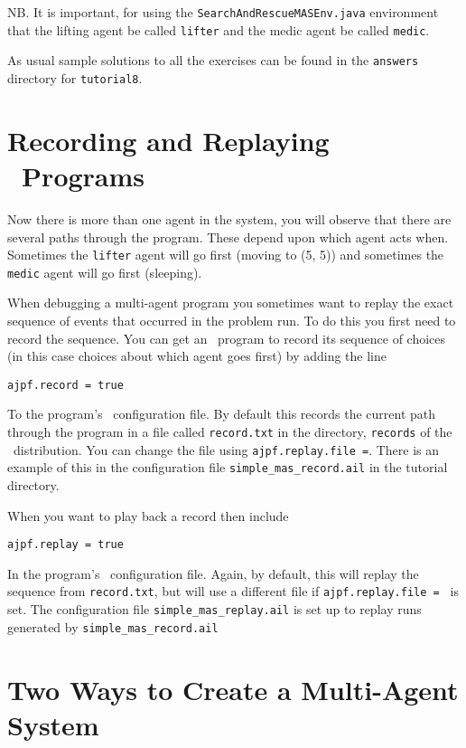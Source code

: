 NB. It is important, for using the \texttt{SearchAndRescueMASEnv.java} environment that the lifting agent be called \texttt{lifter} and the medic agent be called \texttt{medic}.

As usual sample solutions to all the exercises can be found in the \texttt{answers} directory for \texttt{tutorial8}.

\section{Recording and Replaying \ail\ Programs}
Now there is more than one agent in the system, you will observe that there are several paths through the program.  These depend upon which agent acts when.  Sometimes the \texttt{lifter} agent will go first (moving to (5, 5)) and sometimes the \texttt{medic} agent will go first (sleeping).

When debugging a multi-agent program you sometimes want to replay the exact sequence of events that occurred in the  problem run.  To do this you first need to record the sequence.  You can get an \ail\ program to record its sequence of choices (in this case choices about which agent goes first) by adding the line

\begin{verbatim}
ajpf.record = true
\end{verbatim}

To the program's \ail\ configuration file.  By default this records the current path through the program in a file called \texttt{record.txt} in the directory, \texttt{records} of the \mcapl\ distribution.  You can change the file using \texttt{ajpf.replay.file =}.  There is an example of this in the configuration file \texttt{simple\_mas\_record.ail} in the tutorial directory.

When you want to play back a record then include 

\begin{verbatim}
ajpf.replay = true
\end{verbatim}

In the program's \ail\ configuration file.  Again, by default, this will replay the sequence from \texttt{record.txt}, but will use a different file if \texttt{ajpf.replay.file = } is set.  The configuration file \texttt{simple\_mas\_replay.ail} is set up to replay runs generated by \texttt{simple\_mas\_record.ail}

\section{Two Ways to Create a Multi-Agent System}

